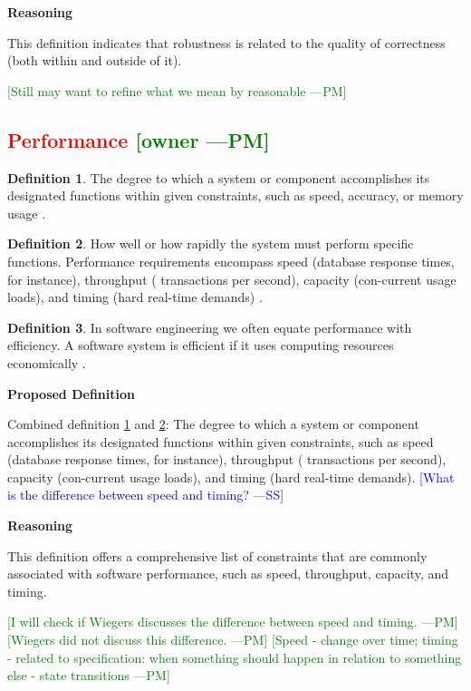 \documentclass[letterpaper,cleveref]{lipics-v2019}
\newcommand{\authornote}[3]{\textcolor{#1}{[#3 ---#2]}}
\newcommand{\authornote}[3]{}
\newcommand{\wss}[1]{\authornote{blue}{SS}{#1}} %
\newcommand{\pmi}[1]{\authornote{green}{PM}{#1}} %
\newcommand{\notdone}[1]{\textcolor{red}{#1}}
\theoremstyle{definition}
\newtheorem{defn}{Definition}
\begin{document}
\noindent \textbf{Reasoning}

This definition indicates that robustness is related to the quality of
correctness (both within and outside of it). 

\pmi{Still may want to refine what we mean by reasonable}

\subsection{\notdone{Performance} \pmi{owner}}

\begin{defn} \label{PerformanceDefnSelected}
The degree to which a system or component accomplishes its designated functions
within given constraints, such as speed, accuracy, or memory usage
\citep{IEEEStdGlossarySET1990}.
\end{defn}
\begin{defn} \label{PerformanceDefnSelected2}
How well or how rapidly the system must perform specific functions. Performance
requirements encompass speed (database response times, for instance), throughput
( transactions per second), capacity (con-current usage loads), and timing (hard
real-time demands) \citep{wiegers2003softreq}.
\end{defn}
\begin{defn}
In software engineering we often equate performance with efficiency. A software
system is efficient if it uses computing resources economically
\citep{ghezzi1991fundamentals}.
\end{defn}

\noindent \textbf{Proposed Definition}

Combined definition \ref{PerformanceDefnSelected} and
\ref{PerformanceDefnSelected2}: The degree to which a system or component
accomplishes its designated functions within given constraints, such as speed
(database response times, for instance), throughput ( transactions per second),
capacity (con-current usage loads), and timing (hard real-time
demands). \wss{What is the difference between speed and timing?}

\noindent \textbf{Reasoning}

This definition offers a comprehensive list of constraints that are commonly associated with software performance, such as speed, throughput, capacity, and timing.

\pmi{I will check if Wiegers discusses the difference between speed and timing.}
\pmi{Wiegers did not discuss this difference.}
\pmi{Speed - change over time; timing - related to specification: when something should happen in relation to something else - state transitions}
\end{document}
